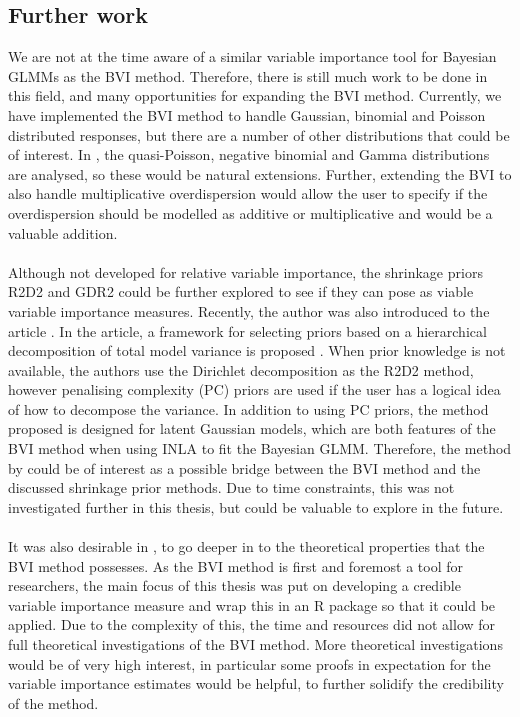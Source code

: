 \subsection*{Further work}
We are not at the time aware of a similar variable importance tool for Bayesian GLMMs as the BVI method. Therefore, there is still much work to be done in this field, and many opportunities for expanding the BVI method. Currently, we have implemented the BVI method to handle Gaussian, binomial and Poisson distributed responses, but there are a number of other distributions that could be of interest. In \citet{nakagawa2017}, the quasi-Poisson, negative binomial and Gamma distributions are analysed, so these would be natural extensions. Further, extending the BVI to also handle multiplicative overdispersion would allow the user to specify if the overdispersion should be modelled as additive or multiplicative and would be a valuable addition.
\\
\\
Although not developed for relative variable importance, the shrinkage priors R2D2 and GDR2 could be further explored to see if they can pose as viable variable importance measures. Recently, the author was also introduced to the article \citet{Fuglstad2020_joint_priors}. In the article, a framework for selecting priors based on a hierarchical decomposition of total model variance is proposed \citep{Fuglstad2020_joint_priors}. When prior knowledge is not available, the authors use the Dirichlet decomposition as the R2D2 method, however penalising complexity (PC) priors are used if the user has a logical idea of how to decompose the variance. In addition to using PC priors, the method proposed is designed for latent Gaussian models, which are both features of the BVI method when using INLA to fit the Bayesian GLMM. Therefore, the method by \citet{Fuglstad2020_joint_priors} could be of interest as a possible bridge between the BVI method and the discussed shrinkage prior methods. Due to time constraints, this was not investigated further in this thesis, but could be valuable to explore in the future.
\\
\\
It was also desirable in \citet{Arnstad:Relative_variable_importance_in_Bayesian_linear_mixed_models:2024}, to go deeper in to the theoretical properties that the BVI method possesses. As the BVI method is first and foremost a tool for researchers, the main focus of this thesis was put on developing a credible variable importance measure and wrap this in an R package so that it could be applied. Due to the complexity of this, the time and resources did not allow for full theoretical investigations of the BVI method. More theoretical investigations would be of very high interest, in particular some proofs in expectation for the variable importance estimates would be helpful, to further solidify the credibility of the method. 
